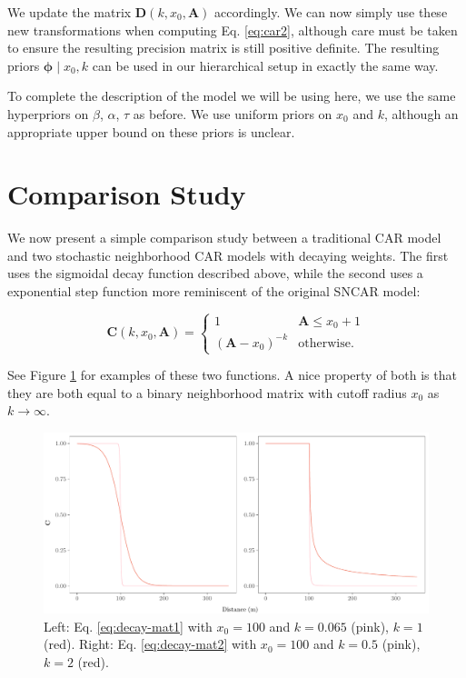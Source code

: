 \documentclass{scrartcl}
\newcommand{\todo}[1]{\textcolor{red}{TODO:
    #1}\PackageWarning{TODO:}{#1!}}
\newcommand{\mat}[1]{\bm{#1}}
\begin{document}
We update the matrix $\mat{D}(k, x_0, \mat{A})$ accordingly. We can
now simply use these new transformations when computing
Eq. \eqref{eq:car2}, although care must be taken to ensure the
resulting precision matrix is still positive definite. The resulting
priors $\mat{\phi} \mid x_0, k$ can be used in our hierarchical setup
in exactly the same way.

To complete the description of the model we will be using here, we use
the same hyperpriors on $\beta$, $\alpha$, $\tau$ as before. We use
uniform priors on $x_0$ and $k$, although an appropriate upper bound
on these priors is unclear. %



\section{Comparison Study}
\label{sec:simulation-study}

We now present a simple comparison study between a traditional CAR
model and two stochastic neighborhood CAR models with decaying
weights. The first uses the sigmoidal decay function described above,
while the second uses a exponential step function more reminiscent of
the original SNCAR model:

\begin{equation}
  \label{eq:decay-mat2}
  \mat{C}(k, x_0, \mat{A}) =
  \begin{cases}
    1 & \mat{A} \leq x_0 + 1\\
    (\mat{A} - x_0)^{-k} & \text{otherwise.}
  \end{cases}
\end{equation}

See Figure \ref{fig:fig1} for examples of these two functions. A nice
property of both is that they are both equal to a binary neighborhood
matrix with cutoff radius $x_0$ as $k \rightarrow\infty$.

\begin{figure}
  \centering
  \includegraphics[width=.75\linewidth]{fig1}
  \caption{Left: Eq. \eqref{eq:decay-mat1} with $x_0 = 100$ and
    $k = 0.065$ (pink), $k = 1$ (red). Right:
    Eq. \eqref{eq:decay-mat2} with $x_0 = 100$ and $k = 0.5$ (pink),
    $k = 2$ (red).}
  \label{fig:fig1}
\end{figure}
\end{document}
